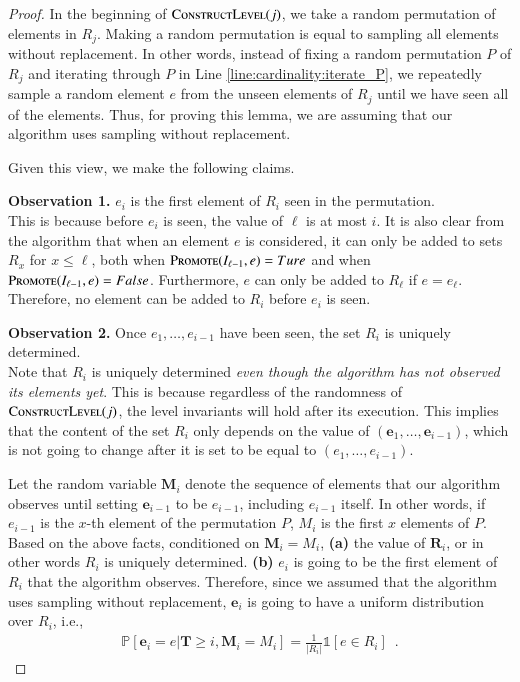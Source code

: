 \documentclass[11pt]{article}
\renewcommand{\Pr}[1]{\ensuremath{\mathbb{P}\left[#1\right]}}
\newcommand{\ind}[1]{\ensuremath{\mathds{1}\left[#1\right]}}
\newcommand{\constLevel}{\textsc{ConstructLevel}}
\newcommand{\suit}{\textsc{Promote}}
\newcommand{\bR}{\ensuremath{\mathbf{R}}}
\newcommand{\bE}{\ensuremath{\mathbf{e}}}
\newcommand{\bT}{\ensuremath{\mathbf{T}}}
\newcommand{\bM}{\ensuremath{\mathbf{M}}}
\begin{document}
\begin{proof}
In the beginning of $\constLevel{}(j)$, we take a random permutation of elements in $R_j$. Making a random permutation is equal to sampling all elements without replacement. 
    In other words, instead of fixing a random permutation $P$ of $R_j$ and iterating through $P$ in Line \ref{line:cardinality:iterate_P}, we repeatedly sample a random element $e$ from the unseen elements of $R_j$ until we have seen all of the elements. 
    Thus, for proving this lemma, we are assuming that our algorithm uses sampling without replacement.

    Given this view, we make the following claims.
    
    \textbf{Observation 1.}
    $e_i$ is the first element of $R_i$ seen in the permutation.~\\
            This is because before $e_i$ is seen,
            the value of $\ell$ is at most $i$. It is also clear from the algorithm that when an element $e$ is considered, it can only be added to sets $R_{x}$ for $x\le \ell$, both when $\suit{}(I_{\ell-1},e)=Ture$ and when $\suit{}(I_{\ell-1},e)=False$.
            Furthermore, $e$ can only be added to $R_{\ell}$ if $e=e_{\ell}$. Therefore, no element can be added to $R_i$ before $e_i$ is seen.
            
    \textbf{Observation 2.}
    Once $e_1, \dots, e_{i-1}$ have been seen, the set $R_i$ is uniquely determined.\\
    Note that $R_i$ is uniquely determined \emph{even though the algorithm has not observed its elements yet}. 
    This is because regardless of the randomness of $\constLevel{}(j)$, the level invariants will hold after its execution. 
    This implies that the content of the set $R_i$ only depends on the value of $(\bE_1, \dots, \bE_{i - 1})$, which is not going to change after it is set to be equal to $(e_1, \dots, e_{i - 1})$. 
    
    Let the random variable $\bM_i$ denote the sequence of elements that our algorithm observes until setting $\bE_{i-1}$ to be $e_{i - 1}$, including $e_{i-1}$ itself.
    In other words, if $e_{i-1}$ is the $x$-th element of the permutation $P$, $M_i$ is the first $x$ elements of $P$.
    ~\\
    Based on the above facts, conditioned on $\bM_i=M_i$, 
    \textbf{(a) }the value of $\bR_i$, or in other words $R_i$ is uniquely determined.
    \textbf{(b)} $e_i$ is going to be the first element of $R_i$ that the algorithm observes. Therefore,
    since we assumed that the algorithm uses sampling without replacement, $\bE_i$ is going to have a uniform distribution over $R_i$, i.e.,
    \begin{align*}
        \Pr{\bE_i = e | 
        \bT \ge i,
        \bM_i = M_i
        }
        = \frac{1}{|R_i|} \ind{e \in R_i} \enspace .
    \end{align*}


\end{proof}
\end{document}
